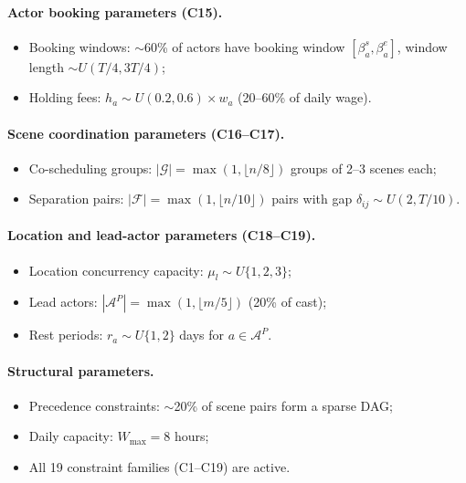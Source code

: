 \paragraph{Actor booking parameters (C15).}
\begin{itemize}
    \item Booking windows: $\sim$60\% of actors have booking window $[\beta^s_a, \beta^e_a]$, window length $\sim U(T/4, 3T/4)$;
    \item Holding fees: $h_a \sim U(0.2, 0.6) \times w_a$ (20--60\% of daily wage).
\end{itemize}

\paragraph{Scene coordination parameters (C16--C17).}
\begin{itemize}
    \item Co-scheduling groups: $|\mathcal{G}| = \max(1, \lfloor n/8 \rfloor)$ groups of 2--3 scenes each;
    \item Separation pairs: $|\mathcal{F}| = \max(1, \lfloor n/10 \rfloor)$ pairs with gap $\delta_{ij} \sim U(2, T/10)$.
\end{itemize}

\paragraph{Location and lead-actor parameters (C18--C19).}
\begin{itemize}
    \item Location concurrency capacity: $\mu_l \sim U\{1, 2, 3\}$;
    \item Lead actors: $|\mathcal{A}^P| = \max(1, \lfloor m/5 \rfloor)$ (20\% of cast);
    \item Rest periods: $r_a \sim U\{1, 2\}$ days for $a \in \mathcal{A}^P$.
\end{itemize}

\paragraph{Structural parameters.}
\begin{itemize}
    \item Precedence constraints: $\sim$20\% of scene pairs form a sparse DAG;
    \item Daily capacity: $W_{\max} = 8$ hours;
    \item All 19 constraint families (C1--C19) are active.
\end{itemize}

